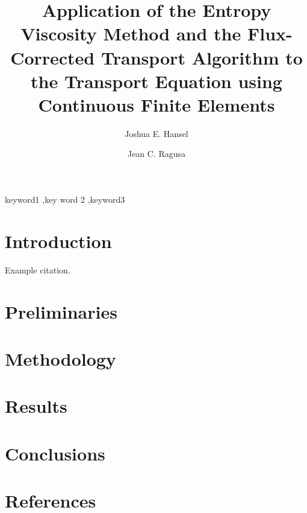 \documentclass{elsarticle}
\begin{document}
\begin{frontmatter}

\title{Application of the Entropy Viscosity Method and the Flux-Corrected Transport
  Algorithm to the Transport Equation using Continuous Finite Elements}

\author[tamu]{Joshua E. Hansel}

\author[tamu]{Jean C. Ragusa}

\address[tamu]{Texas A\&M University,
  400 Bizzell St,
  College Station, TX 77840}



\begin{keyword}
keyword1 \sep key word 2 \sep keyword3
\end{keyword}

\end{frontmatter}


\section{Introduction}
Example citation\cite{dealii}.


\section{Preliminaries}


\section{Methodology}


\section{Results}


\section{Conclusions}


\section*{References}


\end{document}
